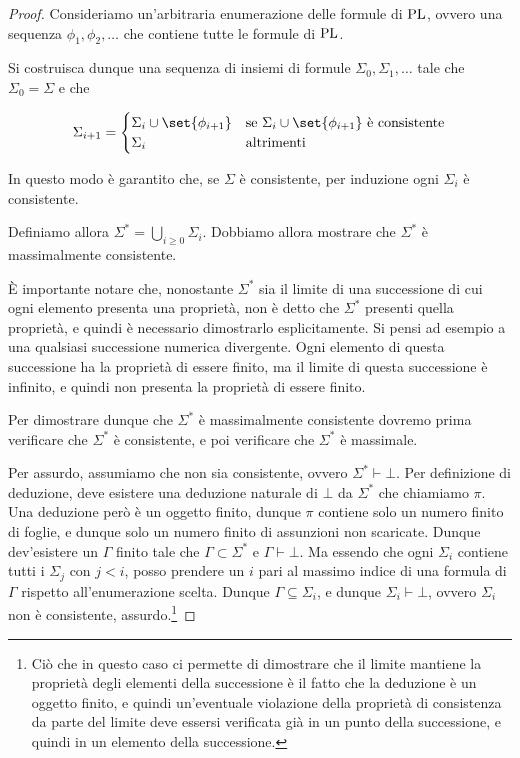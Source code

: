 \begin{proof}
  Consideriamo un'arbitraria enumerazione delle formule di \(\operatorname{PL}\), ovvero una sequenza \(\phi_1,\phi_2,\ldots\) che contiene tutte le formule di \(\operatorname{PL}\).
  
  Si costruisca dunque una sequenza di insiemi di formule \(\Sigma_0,\Sigma_1,\ldots\) tale che \(\Sigma_0 = \Sigma\) e che
  
  \[ \Sigma_{i+1} = \begin{cases}
                      \Sigma_i\cup\set{\phi_{i+1}} & \text{se } \Sigma_i\cup\set{\phi_{i+1}} \text{ è consistente} \\
                      \Sigma_i & \text{altrimenti}
                    \end{cases}
                    \]

  In questo modo è garantito che, se \(\Sigma\) è consistente, per induzione ogni \(\Sigma_i\) è consistente.

  Definiamo allora \(\Sigma^* = \bigcup_{i\geq 0}\Sigma_i\). Dobbiamo allora mostrare che \(\Sigma^*\) è massimalmente consistente.

  È importante notare che, nonostante \(\Sigma^*\) sia il limite di una successione di cui ogni elemento presenta una proprietà, non è detto che \(\Sigma^*\) presenti quella proprietà, e quindi è necessario dimostrarlo esplicitamente. Si pensi ad esempio a una qualsiasi successione numerica divergente. Ogni elemento di questa successione ha la proprietà di essere finito, ma il limite di questa successione è infinito, e quindi non presenta la proprietà di essere finito.

  Per dimostrare dunque che \(\Sigma^*\) è massimalmente consistente dovremo prima verificare che \(\Sigma^*\) è consistente, e poi verificare che \(\Sigma^*\) è massimale.

  Per assurdo, assumiamo che non sia consistente, ovvero \(\Sigma^*\vdash\bot\). Per definizione di deduzione, deve esistere una deduzione naturale di \(\bot\) da \(\Sigma^*\) che chiamiamo \(\pi\). Una deduzione però è un oggetto finito, dunque \(\pi\) contiene solo un numero finito di foglie, e dunque solo un numero finito di assunzioni non scaricate. Dunque dev'esistere un \(\Gamma\) finito tale che \(\Gamma\subset\Sigma^*\) e \(\Gamma\vdash\bot\). Ma essendo che ogni \(\Sigma_i\) contiene tutti i \(\Sigma_j\) con \(j<i\), posso prendere un \(i\) pari al massimo indice di una formula di \(\Gamma\) rispetto all'enumerazione scelta. Dunque \(\Gamma\subseteq\Sigma_i\), e dunque \(\Sigma_i\vdash\bot\), ovvero \(\Sigma_i\) non è consistente, assurdo.\footnote{Ciò che in questo caso ci permette di dimostrare che il limite mantiene la proprietà degli elementi della successione è il fatto che la deduzione è un oggetto finito, e quindi un'eventuale violazione della proprietà di consistenza da parte del limite deve essersi verificata già in un punto della successione, e quindi in un elemento della successione.}


\end{proof}

